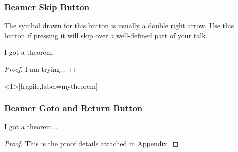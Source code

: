 \begin{frame}[fragile]
\frametitle{Beamer Skip Button}%

  The symbol drawn for this button is usually a double right arrow. Use this button if pressing it will skip over a well-defined part of your talk.

  \begin{theorem}
    I got a theorem.
  \end{theorem}


  \begin{overprint}
    \hfill{}
    \begin{proof}
      I am trying...
    \end{proof}
  \end{overprint}

\end{frame}
\begin{frame}<1>[fragile,label=mytheorem]
\frametitle{Beamer Goto and Return Button}%

  \begin{theorem}
    I got a theorem...
  \end{theorem}
  \begin{overprint}
      \hfill\hyperlink{mytheorem<2>}{}
    \begin{proof}
      This is the proof details attached in Appendix.
    \end{proof}
    \hfill\hyperlink{mytheorem<1>}{}
  \end{overprint}
\end{frame}
